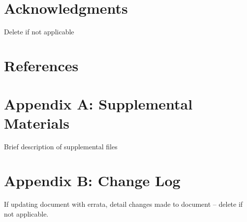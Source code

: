 \documentclass[12pt]{article}
\begin{document}
\section*{Acknowledgments}
\noindent Delete if not applicable\\

\section*{References}




\section*{Appendix A: Supplemental Materials}
Brief description of supplemental files\\

\section*{Appendix B: Change Log}
If updating document with errata, detail changes made to document – delete if not applicable. \\
\end{document}
